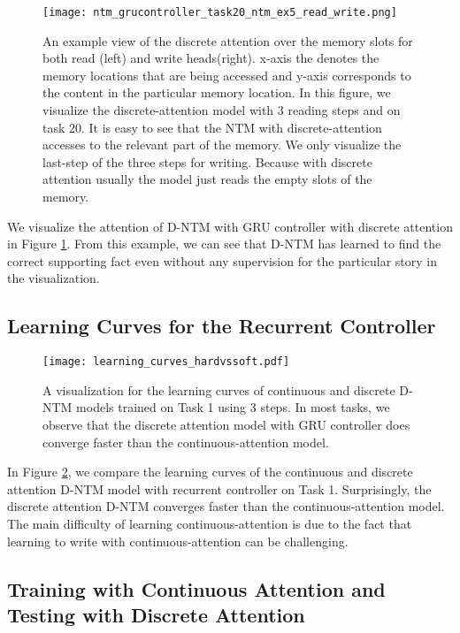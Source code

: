 \documentclass[12pt]{article}
\begin{document}
\begin{figure}[htbp]
\centering
\texttt{[image: ntm\_grucontroller\_task20\_ntm\_ex5\_read\_write.png]}
\caption{An example view of the discrete attention over the memory slots for both read (left)  and write heads(right). x-axis the denotes the memory locations that are being accessed and y-axis corresponds to the content in the particular memory location. In this figure, we visualize the discrete-attention model with 3 reading steps and on task 20. It is easy to see that the NTM with discrete-attention accesses to the relevant part of the memory. We only visualize the last-step of the three steps for writing. Because with discrete attention usually the model just reads the empty slots of the memory.}
\label{fig:ntm_hard_att}

\end{figure}

We visualize the attention of D-NTM with GRU controller with discrete attention in Figure \ref{fig:ntm_hard_att}. From this example, we can see that D-NTM has learned to find the correct supporting fact even without any supervision for the particular story in the visualization. 

\subsection{Learning Curves for the Recurrent Controller}
\begin{figure}[htbp]
\centering
\texttt{[image: learning\_curves\_hardvssoft.pdf]}
\caption{A visualization for the learning curves of continuous and discrete D-NTM models trained on Task 1 using 3 steps. In most tasks, we observe that the discrete attention model with GRU controller does converge faster than the continuous-attention model.}
\label{fig:ntm_learn_curves}
\end{figure}

In Figure \ref{fig:ntm_learn_curves}, we compare the learning curves of the continuous and discrete attention D-NTM model with recurrent controller on Task 1. Surprisingly, the discrete attention D-NTM converges faster than the continuous-attention model. The main difficulty of learning continuous-attention is due to the fact that learning to write with continuous-attention can be challenging.


\subsection{Training with Continuous Attention and Testing with Discrete Attention}
\end{document}

